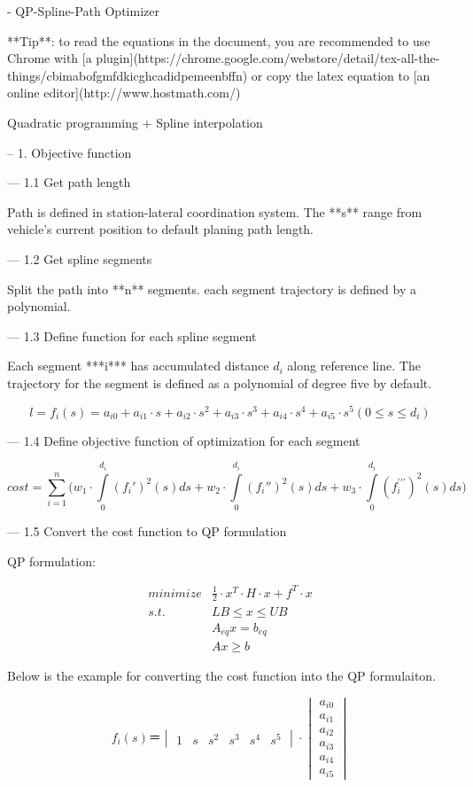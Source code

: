 \documentclass[a4paper,11pt]{article}  %
\begin{document}

- QP-Spline-Path Optimizer

**Tip**: to read the equations in the document, you are recommended to use Chrome with [a plugin](https://chrome.google.com/webstore/detail/tex-all-the-things/cbimabofgmfdkicghcadidpemeenbffn) or copy the latex equation to [an online editor](http://www.hostmath.com/)

Quadratic programming + Spline interpolation

-- 1.  Objective function

--- 1.1  Get path length

Path is defined in station-lateral coordination system. The **s** range from vehicle's current position to  default planing path length.

--- 1.2   Get spline segments

Split the path into **n** segments. each segment trajectory is defined by a polynomial.

--- 1.3  Define function for each spline segment

Each segment ***i*** has accumulated distance $d_i$ along reference line. The trajectory for the segment is defined as a polynomial of degree five by default.


$$
l = f_i(s)
  = a_{i0} + a_{i1} \cdot s + a_{i2} \cdot s^2 + a_{i3} \cdot s^3 + a_{i4} \cdot s^4 + a_{i5} \cdot s^5        (0 \leq s \leq d_{i})
$$


--- 1.4  Define objective function of optimization for each segment


$$
cost = \sum_{i=1}^{n} \Big( w_1 \cdot \int\limits_{0}^{d_i} (f_i')^2(s) ds + w_2 \cdot \int\limits_{0}^{d_i} (f_i'')^2(s) ds + w_3 \cdot \int\limits_{0}^{d_i} (f_i^{\prime\prime\prime})^2(s) ds \Big)
$$


--- 1.5  Convert the cost function to QP formulation

QP formulation:

$$
\begin{aligned}
minimize  & \frac{1}{2}  \cdot x^T \cdot H \cdot x  + f^T \cdot x \\
s.t. \qquad & LB \leq x \leq UB \\
      & A_{eq}x = b_{eq} \\
      & Ax \geq b
\end{aligned}
$$

Below is the example for converting the cost function into the QP formulaiton. 

$$
f_i(s) ＝
\begin{vmatrix} 1 & s & s^2 & s^3 & s^4 & s^5 \end{vmatrix}
\cdot
\begin{vmatrix} a_{i0} \\ a_{i1} \\ a_{i2} \\ a_{i3} \\ a_{i4} \\ a_{i5} \end{vmatrix}   
$$
\end{document}
